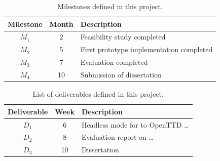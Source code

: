 \documentclass[a4paper,11pt]{article}
\begin{document}
\begin{table}[htbp]
    \begin{center}
        \begin{tabular}{|c|S[table-format=2.0]|l|}
        \hline
        \textbf{Milestone} & \textbf{Month} & \textbf{Description} \\
        \hline
        $M_1$ & 2 & Feasibility study completed \\
        $M_2$ & 5 & First prototype implementation completed \\
        $M_3$ & 7 & Evaluation completed \\
        $M_4$ & 10 & Submission of dissertation \\
        \hline
        \end{tabular} 
    \end{center}
    \caption[Project milestones]{Milestones defined in this project.}
    \label{table:milestones}
\end{table}

\begin{table}[htbp]
    \begin{center}
        \begin{tabular}{|c|S[table-format=2.0]|l|}
        \hline
        \textbf{Deliverable} & \textbf{Week} & \textbf{Description} \\
        \hline
        $D_1$ & 6 & Headless mode for to OpenTTD \ldots\\
        $D_2$ & 8 & Evaluation report on \ldots\\
        $D_3$ & 10 & Dissertation \\
        \hline
        \end{tabular} 
    \end{center}
    \caption[Project deliverables]{List of deliverables defined in this project.}
    \label{table:deliverables}
\end{table}



{\small
}
\end{document}
